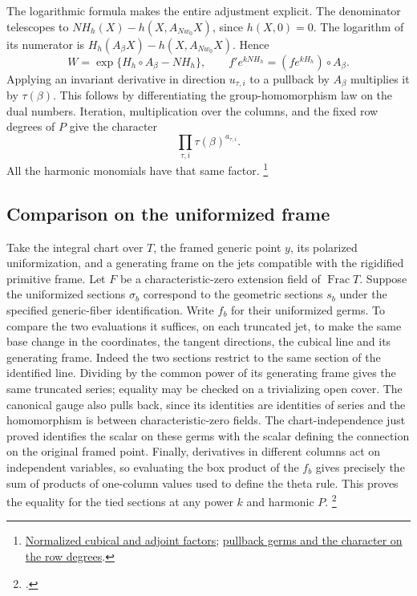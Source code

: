 The logarithmic formula makes the entire adjustment explicit.
The denominator telescopes to
\(NH_h(X)-h(X,A_{Nw_0}X)\), since \(h(X,0)=0\).
The logarithm of its numerator is
\(H_h(A_\beta X)-h(X,A_{Nw_0}X)\). Hence
\[
      W=\exp\{H_h\circ A_\beta-NH_h\},\qquad
      f'e^{kNH_h}=(f e^{kH_h})\circ A_\beta .
\]
Applying an invariant derivative in direction \(u_{\tau,i}\) to a
pullback by \(A_\beta\) multiplies it by \(\tau(\beta)\). This follows
by differentiating the group-homomorphism law on the dual numbers.
Iteration, multiplication over the columns, and the fixed row
degrees of \(P\) give the character
\[
      \prod_{\tau,i}\tau(\beta)^{a_{\tau,i}} .
\]
All the harmonic monomials have that same factor.
\footnote{\href{https://github.com/ChristianKudeba/alpoge-rh-verification/blob/alpoge-source-7cbf7a0c/src/Development/AbelianVarietyTheory/Proofs/JetHarmonics/ThreePointSeriesExponentialOfDefect.lean}{Normalized cubical and adjoint factors};
\href{https://github.com/ChristianKudeba/alpoge-rh-verification/blob/alpoge-source-7cbf7a0c/src/Development/AbelianVarietyTheory/Proofs/JetHarmonics/HarmonicValueNormalisedPullbackChainRule.lean}{pullback germs and the character on the row degrees}.}

\subsection{Comparison on the uniformized frame}

Take the integral chart over \(T\), the framed generic point \(y\),
its polarized uniformization, and a generating frame on the jets
compatible with the rigidified primitive frame. Let \(F\) be a
characteristic-zero extension field of \(\operatorname{Frac}T\).
Suppose the uniformized sections \(\sigma_b\) correspond to the
geometric sections \(s_b\) under the specified generic-fiber
identification. Write \(f_b\) for their uniformized germs. To compare
the two evaluations it suffices, on each truncated jet, to make the
same base change in the coordinates, the tangent directions, the
cubical line and its generating frame. Indeed the two sections
restrict to the same section of the identified line. Dividing by
the common power of its generating frame gives the same truncated
series; equality may be checked on a trivializing open cover.
The canonical gauge also pulls back, since its identities are
identities of series and the homomorphism is between
characteristic-zero fields. The chart-independence just proved
identifies the scalar on these germs with the scalar defining the
connection on the original framed point. Finally, derivatives in
different columns act on independent variables, so evaluating the
box product of the \(f_b\) gives precisely the sum of products of
one-column values used to define the theta rule. This proves the
equality for the tied sections at any power \(k\) and harmonic \(P\).
\footnote{\href{https://github.com/ChristianKudeba/alpoge-rh-verification/blob/alpoge-source-7cbf7a0c/src/Development/AbelianVarietyTheory/Proofs/JetHarmonics/HarmonicValueConnectionIntegralChart.lean}{}.}


